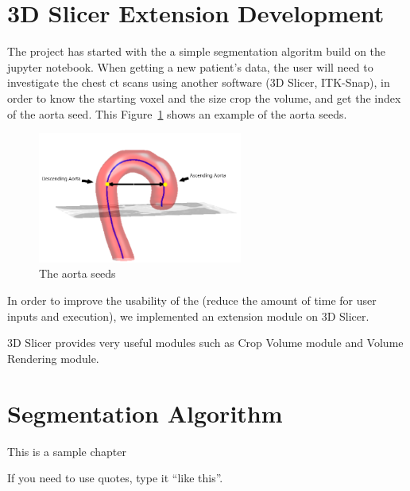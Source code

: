 \section{3D Slicer Extension Development}
The project has started with the a simple segmentation algoritm build on the jupyter notebook. When getting a new patient's data, the user will need to investigate the chest ct scans using another software (3D Slicer, ITK-Snap), in order to know the starting voxel and the size crop the volume, and get the index of the aorta seed. This Figure~\ref{fig_aorta_seed} shows an example of the aorta seeds.

\begin{figure}[ht]
    \centering
    \includegraphics[width=0.6\textwidth]{figures/Sample/Aorta_seeds.png}
    \caption[Single Figure Environment Listed Title]{The aorta seeds}
    \label{fig_aorta_seed}
\end{figure}

In order to improve the usability of the \progname{} (reduce the amount of time for user inputs and execution), we implemented an extension module on 3D Slicer. 

3D Slicer provides very useful modules such as Crop Volume module and Volume Rendering module.

\section{Segmentation Algorithm}

This is a sample chapter

If you need to use quotes, type it ``like this''.


